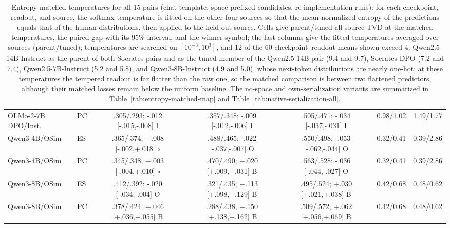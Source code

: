 \begin{table}[t]
\begin{tabular}{@{}llccc@{\hspace{6pt}}cc@{}}
OLMo-2-7B DPO/Inst. & PC & .305/.293; -.012 [-.015,-.008] I & .357/.348; -.009 [-.012,-.006] I & .505/.471; -.034 [-.037,-.031] I & 0.98/1.02 & 1.49/1.77 \\
Qwen3-4B/OSim & ES & .365/.374; +.008 [-.002,+.018] $\circ$ & .488/.465; -.022 [-.037,-.007] O & .550/.498; -.053 [-.062,-.044] O & 0.32/0.41 & 0.39/2.86 \\
Qwen3-4B/OSim & PC & .345/.348; +.003 [-.004,+.010] $\circ$ & .470/.490; +.020 [+.009,+.031] B & .563/.528; -.036 [-.044,-.027] O & 0.32/0.41 & 0.39/2.86 \\
Qwen3-8B/OSim & ES & .412/.392; -.020 [-.034,-.004] O & .321/.435; +.113 [+.098,+.129] B & .495/.524; +.030 [+.021,+.038] B & 0.42/0.68 & 0.48/0.62 \\
Qwen3-8B/OSim & PC & .378/.424; +.046 [+.036,+.055] B & .288/.438; +.150 [+.138,+.162] B & .509/.572; +.062 [+.056,+.069] B & 0.42/0.68 & 0.48/0.62 \\
\bottomrule
\end{tabular}
\caption{Entropy-matched temperatures for all 15 pairs (chat template, space-prefixed candidates, re-implementation runs): for each checkpoint, readout, and source, the softmax temperature is fitted on the other four sources so that the mean normalized entropy of the predictions equals that of the human distributions, then applied to the held-out source. Cells give parent/tuned all-source TVD at the matched temperatures, the paired gap with its 95\% interval, and the winner symbol; the last columns give the fitted temperatures averaged over sources (parent/tuned); temperatures are searched on $[10^{-3},10^{3}]$, and 12 of the 60 checkpoint--readout means shown exceed 4: Qwen2.5-14B-Instruct as the parent of both Socrates pairs and as the tuned member of the Qwen2.5-14B pair (9.4 and 9.7), Socrates-DPO (7.2 and 7.4), Qwen2.5-7B-Instruct (5.2 and 5.8), and Qwen3-8B-Instruct (4.9 and 5.0), whose next-token distributions are nearly one-hot; at these temperatures the tempered readout is far flatter than the raw one, so the matched comparison is between two flattened predictors, although their matched losses remain below the uniform baseline. The no-space and own-serialization variants are summarized in Table~\ref{tab:entropy-matched-map} and Table~\ref{tab:native-serialization-all}.}
\label{tab:entropy-matched}
\end{table}
